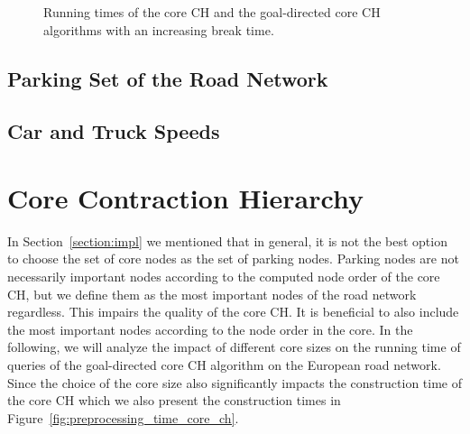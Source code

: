 \begin{figure}[hbtp]
	\centering
	\hfill
	\caption{Running times of the core CH and the goal-directed core CH algorithms with an increasing break time.}
	\label{fig:eval_break_time}
\end{figure}


\subsection{Parking Set of the Road Network}


\subsection{Car and Truck Speeds}


\section{Core Contraction Hierarchy}
In Section~\ref{section:impl} we mentioned that in general, it is not the best option to choose the set of core nodes as the set of parking nodes. Parking nodes are not necessarily important nodes according to the computed node order of the core CH, but we define them as the most important nodes of the road network regardless. This impairs the quality of the core CH. It is beneficial to also include the most important nodes according to the node order in the core. In the following, we will analyze the impact of different core sizes on the running time of queries of the goal-directed core CH algorithm on the European road network. Since the choice of the core size also significantly impacts the construction time of the core CH which we also present the construction times in Figure~\ref{fig:preprocessing_time_core_ch}.

